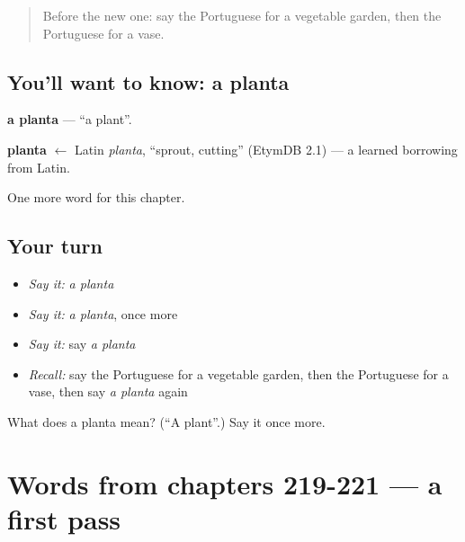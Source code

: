 \label{lesson:PT-C224-planta}



\begin{quote}
Before the new one: say the Portuguese for a vegetable garden, then the Portuguese for a vase.
\end{quote}

\subsection*{You'll want to know: a planta}
\textbf{a planta} — \textquotedblleft{}a plant\textquotedblright{}.

\begin{cousinweb}
\textbf{planta} $\leftarrow$ Latin \emph{planta}, \textquotedblleft{}sprout, cutting\textquotedblright{} (EtymDB 2.1) — a learned borrowing from Latin.
\end{cousinweb}

\begin{grammarlens}[title={What you've built}]
One more word for this chapter.
\end{grammarlens}

\subsection*{Your turn}
\begin{itemize}
\raggedright
  \item \emph{Say it:} \emph{a planta}
  \item \emph{Say it:} \emph{a planta}, once more
  \item \emph{Say it:} say \emph{a planta}
  \item \emph{Recall:} say the Portuguese for a vegetable garden, then the Portuguese for a vase, then say \emph{a planta} again
\end{itemize}

\begin{tcolorbox}[breakable,colback=teal!4,colframe=teal!35!black,title={Before you move on}]
What does a planta mean? (\textquotedblleft{}A plant\textquotedblright{}.) Say it once more.
\end{tcolorbox}
\section[(dialogue)]{Words from chapters 219-221 — a first pass}

\label{lesson:PT-R224-first-pass-words-from-chapters-219-221}



